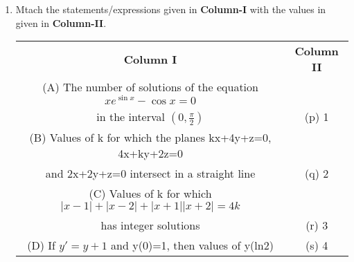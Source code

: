 \begin{enumerate}[label=\arabic*.,ref=\thesubsection.\theenumi]
\item Mtach the statements/expressions given in \textbf{Column-I} with the values in given in \textbf{Column-II}.
\begin{table}[ht!]
\centering
\begin{tabular}{c c} 
 \textbf{Column I} & \textbf{Column II}\\ [0.5ex] 
 (A) The number of solutions of the equation
     $xe^{\sin x}-\cos x=0$\\
     in the interval $(0, \frac{\pi}{2})$                   &(p) 1\\ 
 (B) Values of k for which the planes
      kx+4y+z=0, 4x+ky+2z=0\\ and 2x+2y+z=0
      intersect in a straight line                          &(q) 2\\
 (C) Values of k for which
     $|x-1|+|x-2|+|x+1||x+2|=4k$\\
     has integer solutions                                  &(r) 3\\
 (D) If $y'=y+1$ and y(0)=1,
     then values of y(ln2)                                  &(s) 4\\[1ex]
                                                            
\end{tabular}
\end{table}


\end{enumerate}
